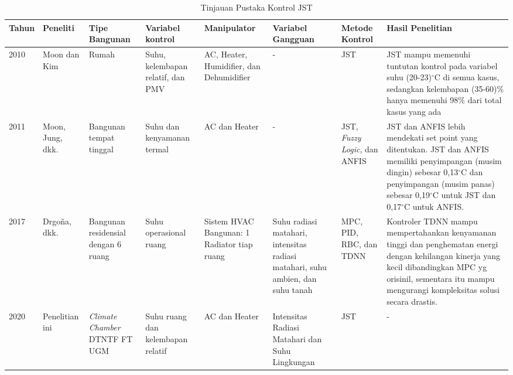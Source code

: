 \begin{landscape}
	\begin{table}[hbt!]
		\caption{Tinjauan Pustaka Kontrol JST}
		\label{tbl:2:studiANN}
		\centering
		\begin{tabular}{|p{1cm}|p{2cm}|p{1.8cm}|p{2.7cm}|p{2.5cm}|p{3.2cm}|p{1.8cm}|p{6.7cm}|}
			\hline
			
			Tahun & Peneliti & Tipe Bangunan & Variabel kontrol & Manipulator & Variabel Gangguan & Metode Kontrol & Hasil Penelitian \\ \hline
			
			2010 \cite{paper22JJkim} & Moon dan Kim & Rumah & Suhu, kelembapan relatif, dan PMV & AC, Heater, Humidifier, dan Dehumidifier & - & JST & JST mampu memenuhi tuntutan kontrol pada variabel suhu (20-23)$^{\circ}$C di semua kasus, sedangkan kelembapan (35-60)\% hanya memenuhi 98\% dari total kasus yang ada \\ \hline
			
			2011 \cite{paper22SKJung} & Moon, Jung, dkk. & Bangunan tempat tinggal& Suhu dan kenyamanan termal & AC dan Heater & - & JST, \textit{Fuzzy Logic}, dan ANFIS & JST dan ANFIS lebih mendekati set point yang ditentukan. JST dan ANFIS memiliki penyimpangan (musim dingin) sebesar 0,13$^{\circ}$C dan penyimpangan (musim panas) sebesar 0,19$^{\circ}$C untuk JST dan 0,17$^{\circ}$C untuk ANFIS. \\ \hline
			
			2017 \cite{paper22JanDrgona} & Drgoňa, dkk. & Bangunan residensial dengan 6 ruang & Suhu operasional ruang & Sistem HVAC Bangunan: 1 Radiator tiap ruang & Suhu radiasi matahari, intensitas radiasi matahari, suhu ambien, dan suhu tanah & MPC, PID, RBC, dan TDNN & Kontroler TDNN mampu mempertahankan kenyamanan tinggi dan penghematan energi dengan kehilangan kinerja yang kecil dibandingkan MPC yg orisinil, sementara itu mampu mengurangi kompleksitas solusi secara drastis. \\ \hline
			
			2020 & Penelitian ini & \textit{Climate Chamber} DTNTF FT UGM & Suhu ruang dan kelembapan relatif & AC dan Heater & Intensitas Radiasi Matahari dan Suhu Lingkungan & JST & - \\ \hline
		\end{tabular}
	\end{table}
\end{landscape}